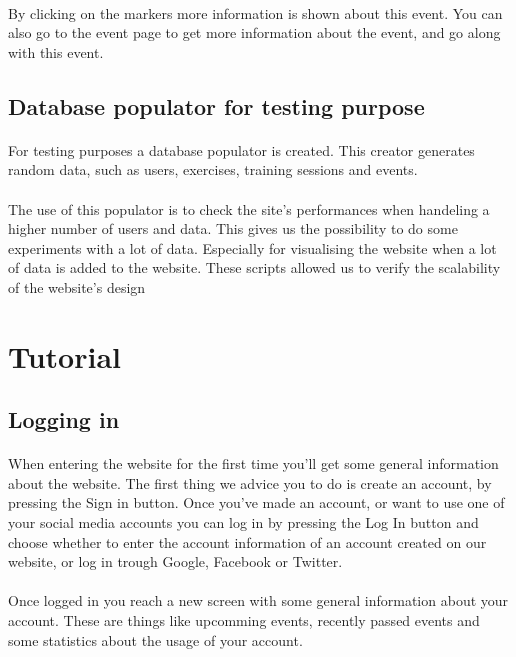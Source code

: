 \documentclass[11pt,a4paper]{scrartcl}
\begin{document}
\paragraph{}By clicking on the markers more information is shown about this event. You can also go to the event page to get more information about the event, and go along with this event.
\subsection{Database populator for testing purpose}
\paragraph{}For testing purposes a database populator is created. This creator generates random data, such as users, exercises, training sessions and events.
\paragraph{}The use of this populator is to check the site's performances when handeling a higher number of users and data. This gives us the possibility to do some experiments with a lot of data. Especially for visualising the website when a lot of data is added to the website. These scripts allowed us to verify the scalability of the website's design
\section{Tutorial}
\subsection{Logging in}
\paragraph{}When entering the website for the first time you'll get some general information about the website. The first thing we advice you to do is create an account, by pressing the Sign in button. Once you've made an account, or want to use one of your social media accounts you can log in by pressing the Log In button and choose whether to enter the account information of an account created on our website, or log in trough Google, Facebook or Twitter.
\paragraph{}Once logged in you reach a new screen with some general information about your account. These are things like upcomming events, recently passed events and some statistics about the usage of your account.
\end{document}
